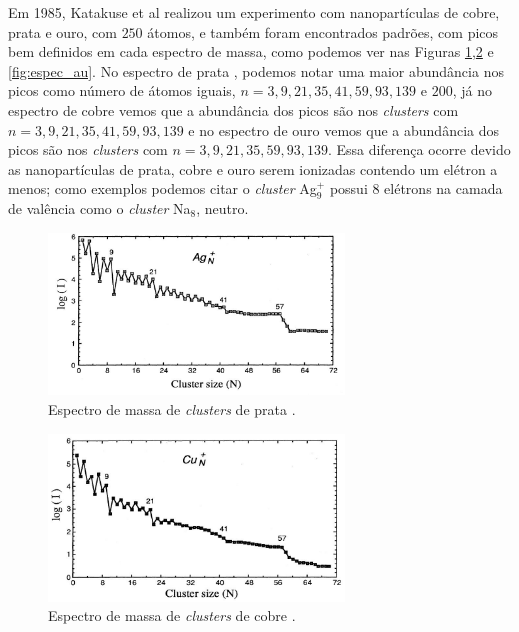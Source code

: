 Em 1985, Katakuse et al \cite{KATAKUSE1985229} realizou um experimento com nanopartículas de cobre, prata e ouro, com $250$ átomos, e também foram encontrados padrões, com picos bem definidos em cada espectro de massa, como podemos ver nas Figuras \ref{fig:espec_ag},\ref{fig:espec_cu} e \ref{fig:espec_au}. No espectro de prata , podemos notar uma maior abundância nos picos como número de átomos iguais, $n= 3,9,21,35,41,59,93,139$ e $200$, já no espectro de cobre vemos que a abundância dos picos são nos \textit{clusters} com $n= 3,9,21,35,41,59,93,139$ e no espectro de ouro vemos que a abundância dos picos são nos \textit{clusters} com $n= 3,9,21,35,59,93,139$. Essa diferença ocorre devido as nanopartículas de prata, cobre e ouro serem ionizadas contendo um elétron a menos; como exemplos podemos citar o \textit{cluster} Ag$_{9}^{+}$  possui 8 elétrons na camada de valência como o \textit{cluster} Na$_{8}$, neutro.






\begin{figure}
  \centering
  \includegraphics[width=0.7\textwidth]{images/clusters/espec_ag}
  \vskip-0.2cm
  \caption{ Espectro de massa de \textit{clusters} de prata \cite{Heer}.  }
  \label{fig:espec_ag}
\end{figure}

\begin{figure}
  \centering
  \includegraphics[width=0.7\textwidth]{images/clusters/espec_cu}
  \vskip-0.2cm
  \caption{ Espectro de massa de \textit{clusters} de cobre \cite{Heer}.  }
  \label{fig:espec_cu}
\end{figure}

